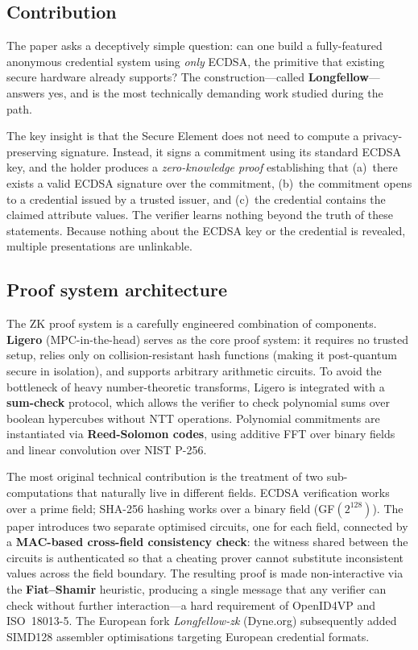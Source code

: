 \documentclass[11pt]{article}
\begin{document}
\subsection{Contribution}

The paper asks a deceptively simple question: can one build a fully-featured
anonymous credential system using \emph{only} ECDSA, the primitive that
existing secure hardware already supports? The construction---called
\textbf{Longfellow}---answers yes, and is the most technically demanding
work studied during the path.

The key insight is that the Secure Element does not need to compute a
privacy-preserving signature. Instead, it signs a commitment using its
standard ECDSA key, and the holder produces a \emph{zero-knowledge proof}
establishing that (a)~there exists a valid ECDSA signature over the
commitment, (b)~the commitment opens to a credential issued by a trusted
issuer, and (c)~the credential contains the claimed attribute values. The
verifier learns nothing beyond the truth of these statements. Because nothing
about the ECDSA key or the credential is revealed, multiple presentations
are unlinkable.

\subsection{Proof system architecture}

The ZK proof system is a carefully engineered combination of components.
\textbf{Ligero} (MPC-in-the-head) serves as the core proof system: it
requires no trusted setup, relies only on collision-resistant hash functions
(making it post-quantum secure in isolation), and supports arbitrary
arithmetic circuits. To avoid the bottleneck of heavy number-theoretic
transforms, Ligero is integrated with a \textbf{sum-check} protocol, which
allows the verifier to check polynomial sums over boolean hypercubes without
NTT operations. Polynomial commitments are instantiated via
\textbf{Reed-Solomon codes}, using additive FFT over binary fields and
linear convolution over NIST P-256.

The most original technical contribution is the treatment of two
sub-computations that naturally live in different fields. ECDSA verification
works over a prime field; SHA-256 hashing works over a binary field
(GF$(2^{128})$). The paper introduces two separate optimised circuits, one
for each field, connected by a \textbf{MAC-based cross-field consistency
check}: the witness shared between the circuits is authenticated so that a
cheating prover cannot substitute inconsistent values across the field
boundary. The resulting proof is made non-interactive via the
\textbf{Fiat--Shamir} heuristic, producing a single message that any
verifier can check without further interaction---a hard requirement of
OpenID4VP and ISO~18013-5. The European fork \emph{Longfellow-zk} (Dyne.org)
subsequently added SIMD128 assembler optimisations targeting European
credential formats.
\end{document}
